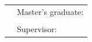 \begin{titlepage}
\begin{flushleft}
\end{flushleft}

\vspace{3cm}

\begin{center}
%
\begin{tabularx}{\textwidth}{X X}  %
 & Master's graduate: \dotfill \\
 & \\
 & Supervisor: \dotfill \\
\end{tabularx}



\end{center}

\end{titlepage}
